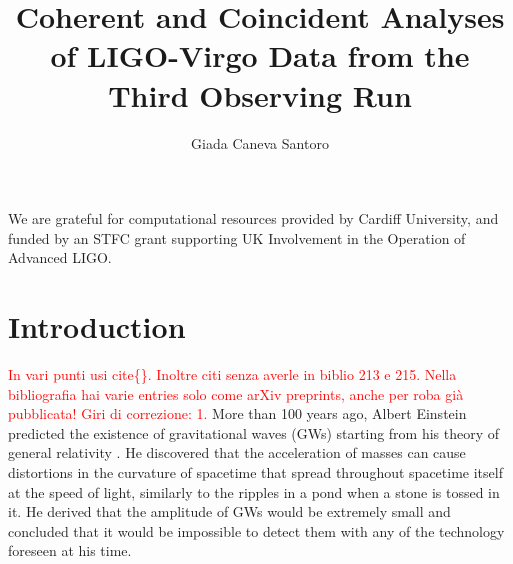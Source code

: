 \documentclass[binding=0.6cm, LaM]{sapthesis}
\title{Coherent and Coincident Analyses of LIGO-Virgo Data from the Third Observing Run}
\author{Giada Caneva Santoro}
\newcommand{\fpg}[1]{\textcolor{red}{#1} }
\begin{document}
\frontmatter
\maketitle
\dedication{Se non tengo presente l’universo, perdo il senso delle proporzioni. \\ Italo Calvino.}


\tableofcontents

\begin{acknowledgments}
We are grateful for computational resources provided by Cardiff University, and funded by an STFC grant supporting UK Involvement in the Operation of Advanced LIGO.
\end{acknowledgments}

\mainmatter 

\chapter*{Introduction}
\label{sec:intro}
%
\fpg{In vari punti usi {\ttfamily cite\{\}}. Inoltre citi senza averle in biblio 213 e 215.  Nella bibliografia hai varie entries solo come arXiv preprints, anche per roba gi\`a pubblicata!}%
\fpg{Giri di correzione: 1.}%
	More than 100 years ago, Albert Einstein predicted the existence of gravitational waves (GWs) starting from his theory of general relativity \cite{1,2}.
	He discovered that the acceleration of masses
	can cause distortions in the curvature of spacetime that 
        spread throughout spacetime itself at the speed of light, similarly to the ripples in a pond when a stone is tossed in it.
	He derived that the amplitude of GWs would be extremely small and concluded that it would be impossible to detect them with any of the technology foreseen at his time.
\end{document}
